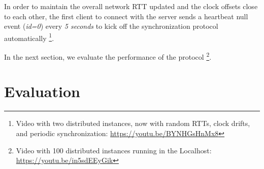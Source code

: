 \documentclass[sigplan,screen]{acmart}
\begin{document}
In order to maintain the overall network RTT updated and the clock offsets
close to each other, the first client to connect with the server sends a
heartbeat null event (\emph{id=0}) every \emph{5 seconds} to kick off the
synchronization protocol automatically%
\footnote {
    Video with two distributed instances, now with random RTTs, clock drifts,
    and periodic synchronization:
    \url{https://youtu.be/BYNHGsHnMx8}
}.

In the next section, we evaluate the performance of the protocol%
\footnote {
    Video with 100 distributed instances running in the Localhost:
    \url{https://youtu.be/in5sdEEyGik}
}.

\section{Evaluation}
\label{sec.eval}
\end{document}
